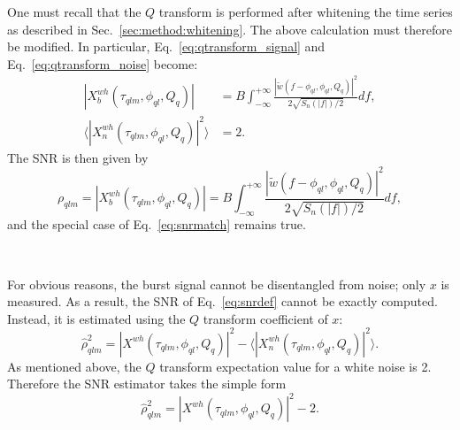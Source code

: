 One must recall that the $Q$ transform is performed after whitening the time series as described in Sec.~\ref{sec:method:whitening}. The above calculation must therefore be modified. In particular, Eq.~\ref{eq:qtransform_signal} and Eq.~\ref{eq:qtransform_noise} become:
\begin{align}
  |X^{wh}_b(\tau_{qlm}, \phi_{ql}, Q_q)| &= B \int_{-\infty}^{+\infty}{\frac{|\tilde{w}(f-\phi_{ql},\phi_{ql},Q_q)|^2}{2\sqrt{S_n(|f|)/2}}df}, \\
  \langle |X^{wh}_n(\tau_{qlm}, \phi_{ql}, Q_q)|^2 \rangle &= 2.
  \label{eq:qtransform_whitened}
\end{align}
The SNR is then given by
\begin{equation}
  \rho_{qlm} = |X^{wh}_b(\tau_{qlm}, \phi_{ql}, Q_q)| = B \int_{-\infty}^{+\infty}{\frac{|\tilde{w}(f-\phi_{ql},\phi_{ql},Q_q)|^2}{2\sqrt{S_n(|f|)/2}}df},
  \label{eq:snr_white}
\end{equation}
and the special case of Eq.~\ref{eq:snrmatch} remains true.

~

For obvious reasons, the burst signal cannot be disentangled from noise; only $x$ is measured. As a result, the SNR of Eq.~\ref{eq:snrdef} cannot be exactly computed. Instead, it is estimated using the $Q$ transform coefficient of $x$:
\begin{equation}
  \hat{\rho}_{qlm}^2 =  |X^{wh}(\tau_{qlm}, \phi_{ql}, Q_q)|^2 - \langle |X^{wh}_n(\tau_{qlm}, \phi_{ql}, Q_q)|^2 \rangle .
\end{equation}
As mentioned above, the $Q$ transform expectation value for a white noise is 2. Therefore the SNR estimator takes the simple form
\begin{equation}
  \hat{\rho}_{qlm}^2 =  |X^{wh}(\tau_{qlm}, \phi_{ql}, Q_q)|^2 - 2 . \label{eq:snrestimator}
\end{equation}

